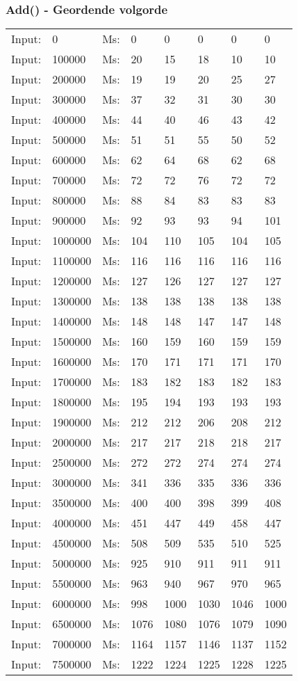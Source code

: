 \documentclass[11pt,a4paper]{report}
\begin{document}
\begin{tiny}
\subsubsection*{Add() - Geordende volgorde}
\begin{tabular}{l l ||l  l  l  l  l  l}
Input:&0&Ms:&0&0&0&0&0\\
Input:&100000&Ms:&20&15&18&10&10\\
Input:&200000&Ms:&19&19&20&25&27\\
Input:&300000&Ms:&37&32&31&30&30\\
Input:&400000&Ms:&44&40&46&43&42\\
Input:&500000&Ms:&51&51&55&50&52\\
Input:&600000&Ms:&62&64&68&62&68\\
Input:&700000&Ms:&72&72&76&72&72\\
Input:&800000&Ms:&88&84&83&83&83\\
Input:&900000&Ms:&92&93&93&94&101\\
Input:&1000000&Ms:&104&110&105&104&105\\
Input:&1100000&Ms:&116&116&116&116&116\\
Input:&1200000&Ms:&127&126&127&127&127\\
Input:&1300000&Ms:&138&138&138&138&138\\
Input:&1400000&Ms:&148&148&147&147&148\\
Input:&1500000&Ms:&160&159&160&159&159\\
Input:&1600000&Ms:&170&171&171&171&170\\
Input:&1700000&Ms:&183&182&183&182&183\\
Input:&1800000&Ms:&195&194&193&193&193\\
Input:&1900000&Ms:&212&212&206&208&212\\
Input:&2000000&Ms:&217&217&218&218&217\\
Input:&2500000&Ms:&272&272&274&274&274\\
Input:&3000000&Ms:&341&336&335&336&336\\
Input:&3500000&Ms:&400&400&398&399&408\\
Input:&4000000&Ms:&451&447&449&458&447\\
Input:&4500000&Ms:&508&509&535&510&525\\
Input:&5000000&Ms:&925&910&911&911&911\\
Input:&5500000&Ms:&963&940&967&970&965\\
Input:&6000000&Ms:&998&1000&1030&1046&1000\\
Input:&6500000&Ms:&1076&1080&1076&1079&1090\\
Input:&7000000&Ms:&1164&1157&1146&1137&1152\\
Input:&7500000&Ms:&1222&1224&1225&1228&1225\\
\end{tabular}


\end{tiny}
\end{document}

